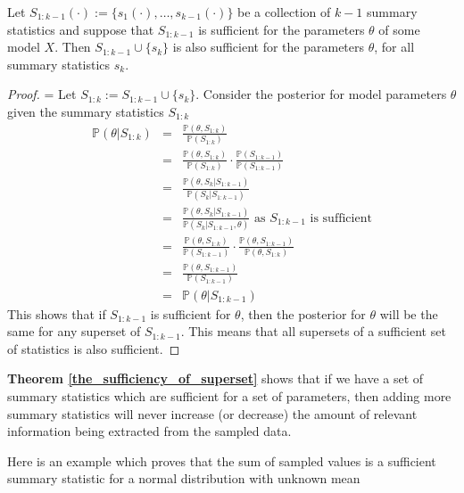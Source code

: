 \documentclass[11pt,a4paper,margin=0]{article}
\newcommand*{\prob}{\mathbb{P}}
\theoremstyle{break}
\begin{document}
  \begin{box_theorem}\label{the_sufficiency_of_superset}
    Let $S_{1:k-1}(\cdot):=\{s_1(\cdot),\dots,s_{k-1}(\cdot)\}$ be a collection of $k-1$ summary statistics and suppose that $S_{1:k-1}$ is sufficient for the parameters $\theta$ of some model $X$. Then $S_{1:k-1}\cup\{s_k\}$ is also sufficient for the parameters $\theta$, for all summary statistics $s_k$.
    \begin{proof}
      \everymath={\displaystyle}
      Let $S_{1:k}:=S_{1:k-1}\cup\{s_k\}$. Consider the posterior for model parameters $\theta$ given the summary statistics $S_{1:k}$
      \[\begin{array}{rcl}
        \prob(\theta|S_{1:k})&=&\frac{\prob(\theta,S_{1:k})}{\prob(S_{1:k})}\\
        &=&\frac{\prob(\theta,S_{1:k})}{\prob(S_{1:k})}\cdot\frac{\prob(S_{1:k-1})}{\prob(S_{1:k-1})}\\
        &=&\frac{\prob(\theta,S_k|S_{1:k-1})}{\prob(S_k|S_{1:k-1})}\\
        &=&\frac{\prob(\theta,S_k|S_{1:k-1})}{\prob(S_k|S_{1:k-1},\theta)}\text{ as }S_{1:k-1}\text{ is sufficient}\\
        &=&\frac{\prob(\theta,S_{1:k})}{\prob(S_{1:k-1})}\cdot\frac{\prob(\theta,S_{1:k-1})}{\prob(\theta,S_{1:k})}\\
        &=&\frac{\prob(\theta,S_{1:k-1})}{\prob(S_{1:k-1})}\\
        &=&\prob(\theta|S_{1:k-1})
      \end{array}\]
      This shows that if $S_{1:k-1}$ is sufficient for $\theta$, then the posterior for $\theta$ will be the same for any superset of $S_{1:k-1}$. This means that all supersets of a sufficient set of statistics is also sufficient.
    \end{proof}
  \end{box_theorem}

  \textbf{Theorem \ref{the_sufficiency_of_superset}} shows that if we have a set of summary statistics which are sufficient for a set of parameters, then adding more summary statistics will never increase (or decrease) the amount of relevant information being extracted from the sampled data.

  \par Here is an example which proves that the sum of sampled values is a sufficient summary statistic for a normal distribution with unknown mean
\end{document}
